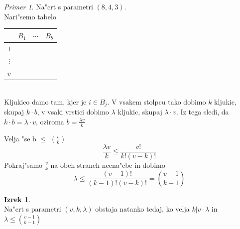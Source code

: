 \documentclass[a4paper,12pt]{article}
\theoremstyle{definition}
\newtheorem{theorem}[counter]{Izrek}
\theoremstyle{remark}
\newtheorem*{ex}{Primer}
\begin{document}
\begin{ex}
	Na"crt s parametri $(8, 4, 3)$.\\
	Nari"semo tabelo
	\begin{tabular}{c|c c c}
		& $B_1$ & $\cdots$ & $B_b$ \\
		\hline
		$1$ \\
		$\vdots$ \\
		$v$
	\end{tabular}\\
	Kljukico damo tam, kjer je $i \in B_j$. V vsakem stolpcu tako dobimo $k$ kljukic, skupaj $k\cdot b$, v vsaki vrstici dobimo $\lambda$ kljukic, skupaj $\lambda \cdot v$. Iz tega sledi, da $k \cdot b = \lambda \cdot v$, oziroma $b = \frac{\lambda v}{k}$

	Velja "se b $\leqslant$ $\binom{v}{k}$
	\[\frac{\lambda v}{k} \leqslant \frac{v!}{k! (v-k)!}\]
	Pokraj"samo $\frac{v}{k}$ na obeh straneh neena"cbe in dobimo
	\[\lambda \leqslant \frac{(v - 1)!}{(k - 1)! (v - k)!} = \binom{v-1}{k-1}\]
\end{ex}

\begin{theorem}\mbox{}\\
	Na"crt s parametri $(v, k, \lambda)$ obstaja natanko tedaj, ko velja $k | v\cdot \lambda$ in $\lambda \leqslant \binom{v - 1}{k - 1}$
\end{theorem}
\end{document}
